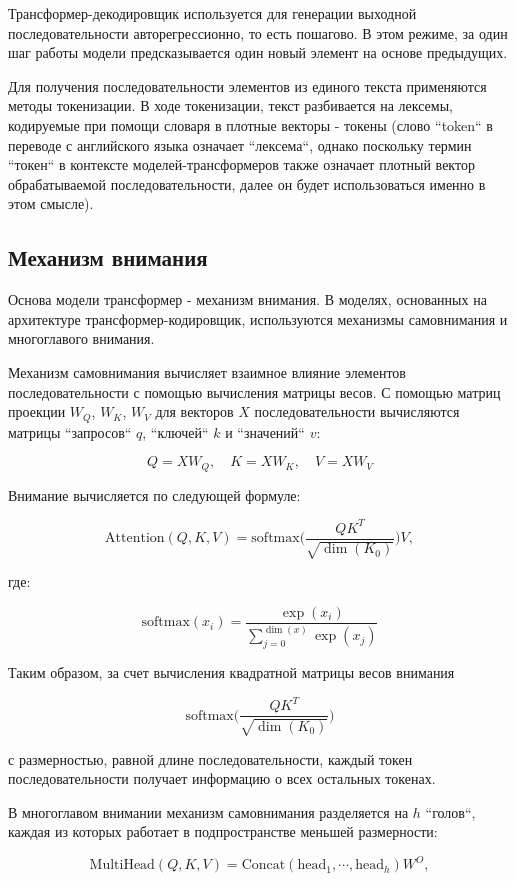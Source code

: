 Трансформер-декодировщик используется для генерации выходной последовательности авторегрессионно, то есть пошагово. В этом режиме, за один шаг работы модели предсказывается один новый элемент на основе предыдущих. 

Для получения последовательности элементов из единого текста применяются методы токенизации. В ходе токенизации, текст разбивается на лексемы, кодируемые при помощи словаря в плотные векторы - токены (слово ``token`` в переводе с английского языка означает ``лексема``, однако поскольку термин ``токен`` в контексте моделей-трансформеров также означает плотный вектор обрабатываемой последовательности, далее он будет использоваться именно в этом смысле).

\subsection{Механизм внимания}

Основа модели трансформер - механизм внимания. В моделях, основанных на архитектуре трансформер-кодировщик, используются механизмы самовнимания и многоглавого внимания. 

Механизм самовнимания вычисляет взаимное влияние элементов последовательности с помощью вычисления матрицы весов. С помощью матриц проекции $W_Q$, $W_K$, $W_V$ для векторов $X$ последовательности вычисляются матрицы ``запросов`` $q$, ``ключей`` $k$ и ``значений`` $v$:

$$
Q = X W_Q, \quad K = X W_K, \quad V = X W_V 
$$

Внимание вычисляется по следующей формуле:

$$
\text{Attention}(Q, K, V) = \text{softmax}\Big(\dfrac{QK^T}{\sqrt{\dim(K_0)}}\Big)V,
$$

где:

$$
\text{softmax}(x_i) = \dfrac{\exp(x_i)}{\sum\limits_{j=0}^{\dim(x)}\exp(x_j)}
$$

Таким образом, за счет вычисления квадратной матрицы весов внимания 

$$\text{softmax}\Big(\dfrac{QK^T}{\sqrt{\dim(K_0)}}\Big)$$

с размерностью, равной длине последовательности, каждый токен последовательности получает информацию о всех остальных токенах.

В многоглавом внимании механизм самовнимания разделяется на $h$ ``голов``, каждая из которых работает в подпространстве меньшей размерности:

$$
\text{MultiHead}(Q, K, V) = \text{Concat}(\text{head}_1, \cdots, \text{head}_h)W^O,
$$

